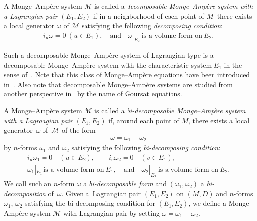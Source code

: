 \begin{Def}
A Monge--Amp{\`e}re system $\mathcal{M}$ is called
a {\it decomposable Monge--Amp{\`e}re system with a Lagrangian pair} $(E_1,E_2)$
if in a neighborhood of each point of $M$, there exists a local generator $\omega$
of $\mathcal{M}$
satisfying the following {\it decomposing condition}:
\begin{gather*}
i_u\omega = 0\ (u\in E_1), \quad \text{and} \quad
\omega\vert_{E_2}\ \text{is a volume form on}\ E_2.
\end{gather*}
\end{Def}

Such a decomposable Monge--Amp{\`e}re system
of Lagrangian type is a decomposable Monge--Amp{\`e}re system with
the characteristic system $E_1$ in the sense of~\cite{M-M}.
Note that this class of Monge--Amp{\`e}re equations have been introduced in~\cite{G}.
Also note that decomposable Monge--Amp{\`e}re systems are studied from another perspective in~\cite{A-B-M-P} by the name of Goursat equations.


\begin{Def}
A Monge--Amp{\`e}re system $\mathcal{M}$ is called
a {\it bi-decomposable Monge--Amp{\`e}re system with a Lagrangian pair} $(E_1,E_2)$
if, around each point of $M$, there exists a local generator~$\omega$
of~$\mathcal{M}$
of the form
\begin{gather*}
\omega=\omega_1-\omega_2
\end{gather*}
by $n$-forms $\omega_1$ and $\omega_2$
satisfying the following {\it bi-decomposing condition}:
\begin{gather*}
i_u\omega_1=0\quad (u\in E_2),\qquad i_v\omega_2=0\quad (v\in E_1),
\\
\omega_1| _{E_1}\ \text{is a volume form on}\ E_1,\quad
\mathrm{and}\quad \omega_2| _{E_2}\ \text{is a volume form on}\ E_2.
\end{gather*}
We call such an $n$-form $\omega$ a {\it bi-decomposable form} and
$(\omega_1, \omega_2)$ a {\it bi-decomposition} of~$\omega$.
Given a~Lagrangian pair $(E_1,E_2)$ on $(M, D)$ and $n$-forms $\omega_1$,
$\omega_2$ satisfying the bi-decomposing condition for $(E_1,E_2)$,
we def\/ine a Monge--Amp{\`e}re system
${\mathcal M}$ with Lagrangian pair
by setting $\omega = \omega_1-\omega_2$.
\end{Def}


